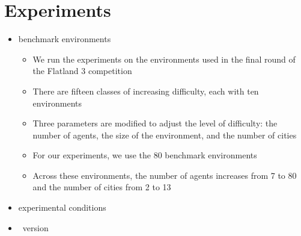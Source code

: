 
\section{Experiments}
\label{sec:experiments}

\begin{itemize}
\item benchmark environments
\begin{itemize}
\item We run the experiments on the environments used in the final round of the Flatland 3 competition
\item There are fifteen classes of increasing difficulty, each with ten environments
\item Three parameters are modified to adjust the level of difficulty: the number of agents, the size of the environment, and the number of cities
\item For our experiments, we use the 80 benchmark environments
\item Across these environments, the number of agents increases from 7 to 80 and the number of cities from 2 to 13
\end{itemize}

\item experimental conditions
\item \clingo\ version
\end{itemize}

